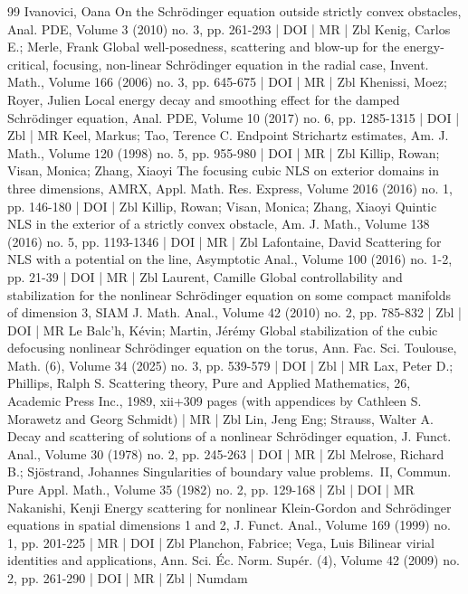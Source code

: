 \documentclass[10pt]{amsart}
\theoremstyle{definition}\newtheorem{defi}[theo]{Definition}\newtheorem{rema}[theo]{Remark}\newtheorem{exam}[theo]{Example}\newtheorem{exem}[theo]{Example}\newtheorem{nota}[theo]{Notation}
\begin{document}
\begin{thebibliography}{99}
Ivanovici, Oana On the Schrödinger equation outside strictly convex obstacles, Anal. PDE, Volume 3 (2010) no. 3, pp. 261-293 | DOI | MR | Zbl
Kenig, Carlos E.; Merle, Frank Global well-posedness, scattering and blow-up for the energy-critical, focusing, non-linear Schrödinger equation in the radial case, Invent. Math., Volume 166 (2006) no. 3, pp. 645-675 | DOI | MR | Zbl
Khenissi, Moez; Royer, Julien Local energy decay and smoothing effect for the damped Schrödinger equation, Anal. PDE, Volume 10 (2017) no. 6, pp. 1285-1315 | DOI | Zbl | MR
Keel, Markus; Tao, Terence C. Endpoint Strichartz estimates, Am. J. Math., Volume 120 (1998) no. 5, pp. 955-980 | DOI | MR | Zbl
Killip, Rowan; Visan, Monica; Zhang, Xiaoyi The focusing cubic NLS on exterior domains in three dimensions, AMRX, Appl. Math. Res. Express, Volume 2016 (2016) no. 1, pp. 146-180 | DOI | Zbl
Killip, Rowan; Visan, Monica; Zhang, Xiaoyi Quintic NLS in the exterior of a strictly convex obstacle, Am. J. Math., Volume 138 (2016) no. 5, pp. 1193-1346 | DOI | MR | Zbl
Lafontaine, David Scattering for NLS with a potential on the line, Asymptotic Anal., Volume 100 (2016) no. 1-2, pp. 21-39 | DOI | MR | Zbl
Laurent, Camille Global controllability and stabilization for the nonlinear Schrödinger equation on some compact manifolds of dimension 3, SIAM J. Math. Anal., Volume 42 (2010) no. 2, pp. 785-832 | Zbl | DOI | MR
Le Balc’h, Kévin; Martin, Jérémy Global stabilization of the cubic defocusing nonlinear Schrödinger equation on the torus, Ann. Fac. Sci. Toulouse, Math. (6), Volume 34 (2025) no. 3, pp. 539-579 | DOI | Zbl | MR
Lax, Peter D.; Phillips, Ralph S. Scattering theory, Pure and Applied Mathematics, 26, Academic Press Inc., 1989, xii+309 pages (with appendices by Cathleen S. Morawetz and Georg Schmidt) | MR | Zbl
Lin, Jeng Eng; Strauss, Walter A. Decay and scattering of solutions of a nonlinear Schrödinger equation, J. Funct. Anal., Volume 30 (1978) no. 2, pp. 245-263 | DOI | MR | Zbl
Melrose, Richard B.; Sjöstrand, Johannes Singularities of boundary value problems. II, Commun. Pure Appl. Math., Volume 35 (1982) no. 2, pp. 129-168 | Zbl | DOI | MR
Nakanishi, Kenji Energy scattering for nonlinear Klein-Gordon and Schrödinger equations in spatial dimensions 1 and 2, J. Funct. Anal., Volume 169 (1999) no. 1, pp. 201-225 | MR | DOI | Zbl
Planchon, Fabrice; Vega, Luis Bilinear virial identities and applications, Ann. Sci. Éc. Norm. Supér. (4), Volume 42 (2009) no. 2, pp. 261-290 | DOI | MR | Zbl | Numdam

\end{thebibliography}
\end{document}
